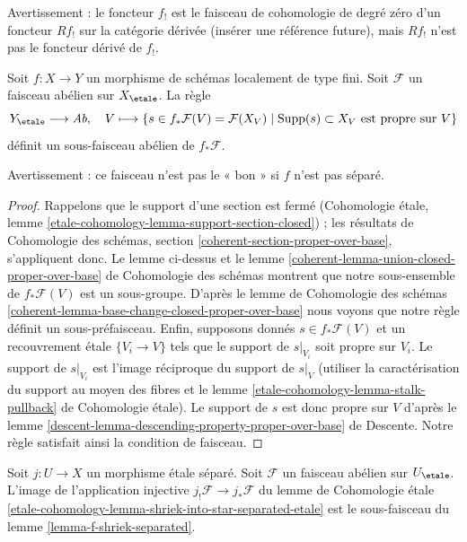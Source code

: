 \medskip\noindent
Avertissement : le foncteur $f_!$ est le faisceau de cohomologie de degré zéro
d'un foncteur $Rf_!$ sur la catégorie dérivée (insérer une référence future),
mais $Rf_!$ n'est pas le foncteur dérivé de $f_!$.

\begin{lemma}
\label{lemma-f-shriek-separated}
Soit $f : X \to Y$ un morphisme de schémas localement de type fini.
Soit $\mathcal{F}$ un faisceau abélien sur $X_\etale$. La règle
$$
Y_\etale \longrightarrow \textit{Ab},\quad
V \longmapsto \{s \in f_*\mathcal{F}(V) = \mathcal{F}(X_V) \mid
\text{Supp}(s) \subset X_V \text{ est propre sur }V\}
$$
définit un sous-faisceau abélien de $f_*\mathcal{F}$.
\end{lemma}

\noindent
Avertissement : ce faisceau n'est pas le « bon » si $f$ n'est pas séparé.

\begin{proof}
Rappelons que le support d'une section est fermé
(Cohomologie étale, lemme \ref{etale-cohomology-lemma-support-section-closed}) ;
les résultats de
Cohomologie des schémas, section \ref{coherent-section-proper-over-base},
s'appliquent donc. Le lemme ci-dessus et le lemme
\ref{coherent-lemma-union-closed-proper-over-base} de Cohomologie des schémas
montrent que notre sous-ensemble de $f_*\mathcal{F}(V)$ est un sous-groupe.
D'après le lemme de Cohomologie des schémas
\ref{coherent-lemma-base-change-closed-proper-over-base}
nous voyons que notre règle définit un sous-préfaisceau.
Enfin, supposons donnés $s \in f_*\mathcal{F}(V)$
et un recouvrement étale $\{V_i \to V\}$ tels que
le support de $s|_{V_i}$ soit propre sur $V_i$.
Le support de $s|_{V_i}$ est l'image réciproque du
support de $s|_V$ (utiliser la caractérisation du support
au moyen des fibres et le lemme
\ref{etale-cohomology-lemma-stalk-pullback} de Cohomologie étale).
Le support de $s$ est donc propre sur $V$ d'après le lemme
\ref{descent-lemma-descending-property-proper-over-base} de Descente.
Notre règle satisfait ainsi la condition de faisceau.
\end{proof}

\begin{lemma}
\label{lemma-separated-etale-shriek}
Soit $j : U \to X$ un morphisme étale séparé. Soit $\mathcal{F}$
un faisceau abélien sur $U_\etale$. L'image de l'application injective
$j_!\mathcal{F} \to j_*\mathcal{F}$
du lemme de Cohomologie étale
\ref{etale-cohomology-lemma-shriek-into-star-separated-etale}
est le sous-faisceau du lemme \ref{lemma-f-shriek-separated}.
\end{lemma}

